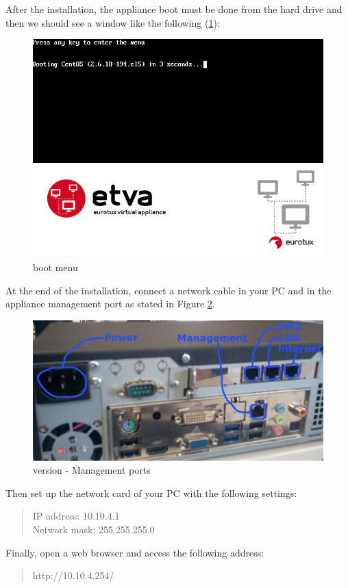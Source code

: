 After the installation, the appliance boot must be done from the hard drive and then we should see a window like the following (\ref{fig:boot_screen_standard}):

\begin{figure}[H]
	\begin{center}
	\includegraphics[scale=0.5]{screenshots/install_etva11.png}
	\caption{\acronym boot menu}
	\label{fig:boot_screen_standard}
	\end{center}
\end{figure}

At the end of the installation, connect a network cable in your PC and in the appliance management port as stated in Figure \ref{fig:back_standard}.

\begin{figure}[H]
	\begin{center}
	\includegraphics[scale=0.12]{screenshots/appliance_back_identifica.jpg}
	\caption{\acronym version - Management ports}
	\label{fig:back_standard}
	\end{center}
\end{figure}

Then set up the network card of your PC with the following settings:

\begin{quote}
IP address: 10.10.4.1\\
Network mask: 255.255.255.0
\end{quote}

Finally, open a web browser and access the following address:
\begin{quote}
http://10.10.4.254/
\end{quote}

\pagebreak
